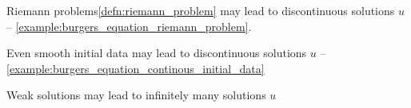 \begin{sectionbox}[Problems]\nospacing
    \begin{circlelistnosep}
        \item Riemann problems\cref{defn:riemann_problem} may lead to discontinuous solutions
        $u$ -- \cref{example:burgers_equation_riemann_problem}.
        \item Even smooth initial data may lead to discontinuous solutions $u$ -- \cref{example:burgers_equation_continous_initial_data}
        \item Weak solutions may lead to infinitely many solutions $u$
    \end{circlelistnosep}
\end{sectionbox}

